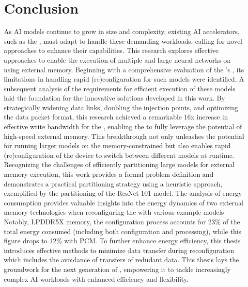 \section{Conclusion}
As AI models continue to grow in size and complexity, existing AI accelerators, such as the \graicore{}, must adapt to handle these demanding workloads, calling for novel approaches to enhance their capabilities.
This research explores effective approaches to enable the execution of multiple and large neural networks on \graicore{} using external memory.
Beginning with a comprehensive evaluation of the \graicore{}'s \confignoc{}, its limitations in handling rapid (re)configuration for such models were identified.
A subsequent analysis of the requirements for efficient execution of these models laid the foundation for the innovative solutions developed in this work.
By strategically widening data links, doubling the injection points, and optimizing the data packet format, this research achieved a remarkable 16x increase in effective write bandwidth for the \confignoc{}, enabling the \graicore{} to fully leverage the potential of high-speed external memory.
This breakthrough not only unleashes the potential for running larger models on the memory-constrained \graicore{} but also enables rapid (re)configuration of the device to switch between different models at runtime.
Recognizing the challenges of efficiently partitioning large models for external memory execution, this work provides a formal problem definition and demonstrates a practical partitioning strategy using a heuristic approach, exemplified by the partitioning of the ResNet-101 model.
The analysis of energy consumption provides valuable insights into the energy dynamics of two external memory technologies when reconfiguring the \graicore{} with various example models
Notably, LPDDR5X memory, the configuration process accounts for 23\% of the total energy consumed (including both configuration and processing), while this figure drops to 12\% with PCM.
To further enhance energy efficiency, this thesis introduces effective methods to minimize data transfer during reconfiguration which includes the avoidance of transfers of redudant data.
This thesis lays the groundwork for the next generation of \graicore{}, empowering it to tackle increasingly complex AI workloads with enhanced efficiency and flexibility.

